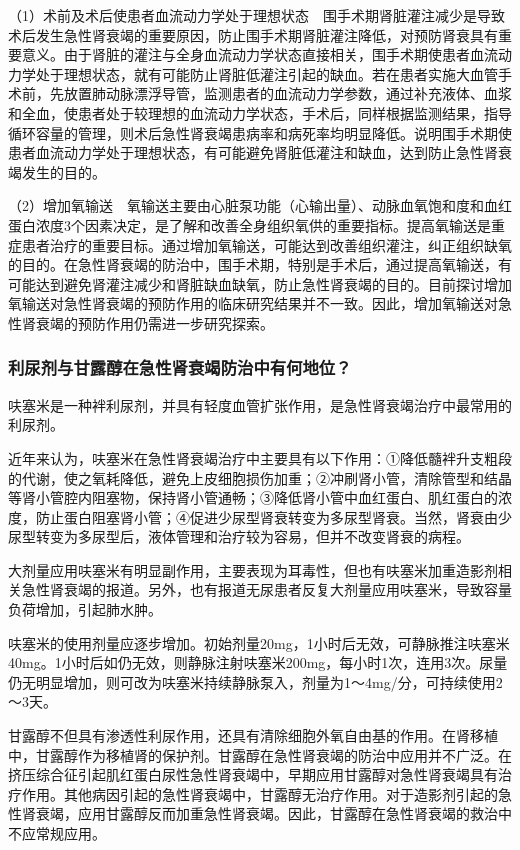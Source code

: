 （1）术前及术后使患者血流动力学处于理想状态　围手术期肾脏灌注减少是导致术后发生急性肾衰竭的重要原因，防止围手术期肾脏灌注降低，对预防肾衰具有重要意义。由于肾脏的灌注与全身血流动力学状态直接相关，围手术期使患者血流动力学处于理想状态，就有可能防止肾脏低灌注引起的缺血。若在患者实施大血管手术前，先放置肺动脉漂浮导管，监测患者的血流动力学参数，通过补充液体、血浆和全血，使患者处于较理想的血流动力学状态，手术后，同样根据监测结果，指导循环容量的管理，则术后急性肾衰竭患病率和病死率均明显降低。说明围手术期使患者血流动力学处于理想状态，有可能避免肾脏低灌注和缺血，达到防止急性肾衰竭发生的目的。

（2）增加氧输送　氧输送主要由心脏泵功能（心输出量）、动脉血氧饱和度和血红蛋白浓度3个因素决定，是了解和改善全身组织氧供的重要指标。提高氧输送是重症患者治疗的重要目标。通过增加氧输送，可能达到改善组织灌注，纠正组织缺氧的目的。在急性肾衰竭的防治中，围手术期，特别是手术后，通过提高氧输送，有可能达到避免肾灌注减少和肾脏缺血缺氧，防止急性肾衰竭的目的。目前探讨增加氧输送对急性肾衰竭的预防作用的临床研究结果并不一致。因此，增加氧输送对急性肾衰竭的预防作用仍需进一步研究探索。

\subsubsection{利尿剂与甘露醇在急性肾衰竭防治中有何地位？}

呋塞米是一种袢利尿剂，并具有轻度血管扩张作用，是急性肾衰竭治疗中最常用的利尿剂。

近年来认为，呋塞米在急性肾衰竭治疗中主要具有以下作用：①降低髓袢升支粗段的代谢，使之氧耗降低，避免上皮细胞损伤加重；②冲刷肾小管，清除管型和结晶等肾小管腔内阻塞物，保持肾小管通畅；③降低肾小管中血红蛋白、肌红蛋白的浓度，防止蛋白阻塞肾小管；④促进少尿型肾衰转变为多尿型肾衰。当然，肾衰由少尿型转变为多尿型后，液体管理和治疗较为容易，但并不改变肾衰的病程。

大剂量应用呋塞米有明显副作用，主要表现为耳毒性，但也有呋塞米加重造影剂相关急性肾衰竭的报道。另外，也有报道无尿患者反复大剂量应用呋塞米，导致容量负荷增加，引起肺水肿。

呋塞米的使用剂量应逐步增加。初始剂量20mg，1小时后无效，可静脉推注呋塞米40mg。1小时后如仍无效，则静脉注射呋塞米200mg，每小时1次，连用3次。尿量仍无明显增加，则可改为呋塞米持续静脉泵入，剂量为1～4mg/分，可持续使用2～3天。

甘露醇不但具有渗透性利尿作用，还具有清除细胞外氧自由基的作用。在肾移植中，甘露醇作为移植肾的保护剂。甘露醇在急性肾衰竭的防治中应用并不广泛。在挤压综合征引起肌红蛋白尿性急性肾衰竭中，早期应用甘露醇对急性肾衰竭具有治疗作用。其他病因引起的急性肾衰竭中，甘露醇无治疗作用。对于造影剂引起的急性肾衰竭，应用甘露醇反而加重急性肾衰竭。因此，甘露醇在急性肾衰竭的救治中不应常规应用。

